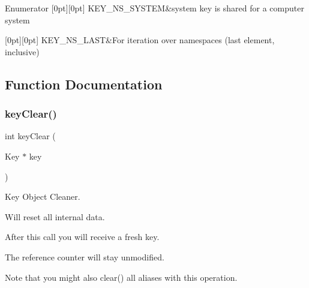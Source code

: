 \begin{DoxyEnumFields}{Enumerator}
[0pt][0pt]{}\mbox{\label{group__key_ggaec3b8d6f430ae49b91bafe8a86310a68a61adca2f9dff47e65dfcdb492ffa7a20}} 
K\+E\+Y\+\_\+\+N\+S\+\_\+\+S\+Y\+S\+T\+EM&system key is shared for a computer system \\
\hline

[0pt][0pt]{}\mbox{\label{group__key_ggaec3b8d6f430ae49b91bafe8a86310a68ad4d0f219a657517ddd50cd06c8190310}} 
K\+E\+Y\+\_\+\+N\+S\+\_\+\+L\+A\+ST&For iteration over namespaces (last element, inclusive) \\
\hline

\end{DoxyEnumFields}


\subsection{Function Documentation}
\mbox{\label{group__key_gab2242311a36bbc0520e0d36895107ec1}} 
\subsubsection{\texorpdfstring{key\+Clear()}{keyClear()}}
{\footnotesize\ttfamily int key\+Clear (\begin{DoxyParamCaption}\item[{Key $\ast$}]{key }\end{DoxyParamCaption})}



Key Object Cleaner. 

Will reset all internal data.

After this call you will receive a fresh key.

The reference counter will stay unmodified.

\begin{DoxyNote}{Note}
that you might also clear() all aliases with this operation.
\end{DoxyNote}

